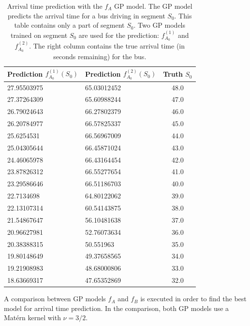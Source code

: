 \begin{table}
    \centering
    \caption[Arrival time prediction with the $f_A$ GP model]%
    {{\small Arrival time prediction with the $f_A$ GP model.
    The GP model predicts the arrival time for a bus driving in segment $S_0$.
    This table contains only a part of segment $S_0$.
    Two GP models trained on segment $S_0$ are used for the prediction: $f^{(1)}_{A_0}$ and $f^{(2)}_{A_0}$.
    The right column contains the true arrival time (in seconds remaining) for the bus.}}
    \label{table:f_A-examples} 
    \begin{tabular}{ |l|l|c| } 
        \hline
        Prediction $f^{(1)}_{A_0}(S_0)$ & Prediction $f^{(2)}_{A_0}(S_0)$ & Truth $S_0$ \\ [0.5ex] 
        \hline
        27.95503975 & 65.03012452 & 48.0 \\
        27.37264309 & 65.60988244 & 47.0 \\
        26.79024643 & 66.27802379 & 46.0 \\
        26.20784977 & 66.57825337 & 45.0 \\
        25.6254531 & 66.56967009 & 44.0 \\
        25.04305644 & 66.45871024 & 43.0 \\
        24.46065978 & 66.43164454 & 42.0 \\
        23.87826312 & 66.55277654 & 41.0 \\
        23.29586646 & 66.51186703 & 40.0 \\
        22.7134698 & 64.80122062 & 39.0 \\
        22.13107314 & 60.54143875 & 38.0 \\
        21.54867647 & 56.10481638 & 37.0 \\
        20.96627981 & 52.76073634 & 36.0 \\
        20.38388315 & 50.551963 & 35.0 \\
        19.80148649 & 49.37658565 & 34.0 \\
        19.21908983 & 48.68000806 & 33.0 \\
        18.63669317 & 47.65352869 & 32.0 \\
        \hline
    \end{tabular}
\end{table}

A comparison between GP models $f_A$ and $f_B$ is executed in order to find the best model for arrival time prediction.
In the comparison, both GP models use a Matérn kernel with $\nu =3/2$.

